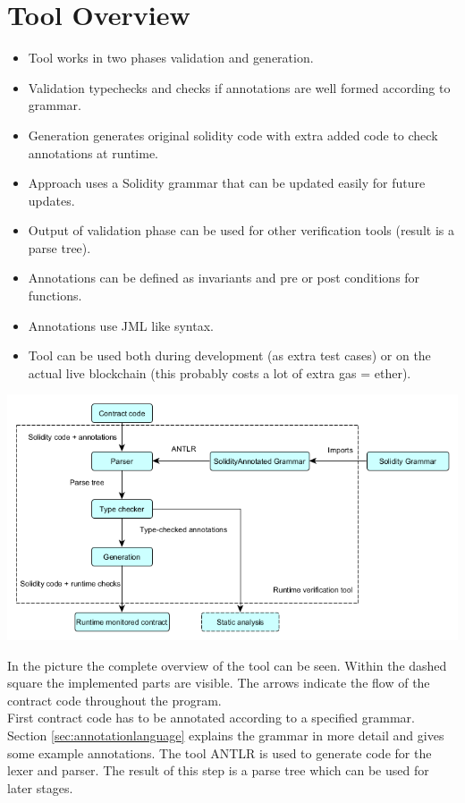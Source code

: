 \documentclass[a4paper]{article}
\begin{document}
\section{Tool Overview}
\begin{itemize}
  \item Tool works in two phases validation and generation.
  \item Validation typechecks and checks if annotations are well formed according to grammar.
  \item Generation generates original solidity code with extra added code to check annotations at runtime.
  \item Approach uses a Solidity grammar that can be updated easily for future updates.
  \item Output of validation phase can be used for other verification tools (result is a parse tree).
  \item Annotations can be defined as invariants and pre or post conditions for functions.
  \item Annotations use JML like syntax.
  \item Tool can be used both during development (as extra test cases) or on the actual live blockchain (this probably costs a lot of extra gas = ether).
\end{itemize}
\begin{center}
  \includegraphics[width=\textwidth,height=\textheight,keepaspectratio]{resources/ToolOverview.png}
\end{center}
In the picture the complete overview of the tool can be seen. Within the dashed square the implemented parts are visible. The arrows indicate the flow of the contract code throughout the program. \\
First contract code has to be annotated according to a specified grammar. Section \ref{sec:annotationlanguage} explains the grammar in more detail and gives some example annotations. The tool ANTLR is used to generate code for the lexer and parser. The result of this step is a parse tree which can be used for later stages. \\
\end{document}
